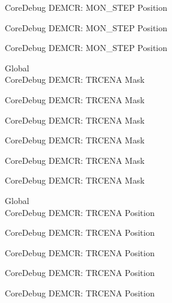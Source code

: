 \begin{DoxyRefList}
\label{deprecated__deprecated000411}%
%
Core\+Debug DEMCR\+: MON\+\_\+\+STEP Position 

\label{deprecated__deprecated000500}%
%
Core\+Debug DEMCR\+: MON\+\_\+\+STEP Position 

\label{deprecated__deprecated000602}%
%
Core\+Debug DEMCR\+: MON\+\_\+\+STEP Position  
\item[Global \doxylink{group___c_m_s_i_s___core_debug_ga5e99652c1df93b441257389f49407834}{Core\+Debug\+\_\+\+DEMCR\+\_\+\+TRCENA\+\_\+\+Msk} ]\hfill \\
\label{deprecated__deprecated000046}%
%
Core\+Debug DEMCR\+: TRCENA Mask 

\label{deprecated__deprecated000190}%
%
Core\+Debug DEMCR\+: TRCENA Mask 

\label{deprecated__deprecated000332}%
%
Core\+Debug DEMCR\+: TRCENA Mask 

\label{deprecated__deprecated000408}%
%
Core\+Debug DEMCR\+: TRCENA Mask 

\label{deprecated__deprecated000497}%
%
Core\+Debug DEMCR\+: TRCENA Mask 

\label{deprecated__deprecated000599}%
%
Core\+Debug DEMCR\+: TRCENA Mask  
\item[Global \doxylink{group___c_m_s_i_s___core_debug_ga6ff2102b98f86540224819a1b767ba39}{Core\+Debug\+\_\+\+DEMCR\+\_\+\+TRCENA\+\_\+\+Pos} ]\hfill \\
\label{deprecated__deprecated000045}%
%
Core\+Debug DEMCR\+: TRCENA Position 

\label{deprecated__deprecated000189}%
%
Core\+Debug DEMCR\+: TRCENA Position 

\label{deprecated__deprecated000331}%
%
Core\+Debug DEMCR\+: TRCENA Position 

\label{deprecated__deprecated000407}%
%
Core\+Debug DEMCR\+: TRCENA Position 

\label{deprecated__deprecated000496}%
%
Core\+Debug DEMCR\+: TRCENA Position 


\end{DoxyRefList}
